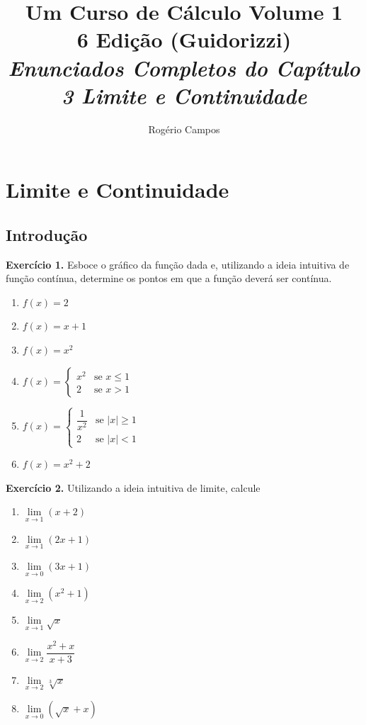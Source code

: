 \documentclass[12pt,a4paper]{article}
\title{
    \Huge \textbf{Um Curso de Cálculo Volume 1} \\
    \vspace{0.3cm}
    \Large 6\textordfeminine{} Edição (Guidorizzi) \\
    \vspace{0.5cm}
    \large \textit{Enunciados Completos do Capítulo 3 Limite e Continuidade}
}
\author{Rogério Campos}
\begin{document}
\maketitle
\newpage

\tableofcontents
\newpage

\setcounter{section}{2}
\setcounter{subsection}{1}

\section{Limite e Continuidade}
\subsection{Introdução}
\vspace{0.5cm}
\noindent\textbf{Exercício 1.} Esboce o gráfico da função dada e, utilizando a ideia intuitiva de função contínua, determine os pontos em que a função deverá ser contínua.
\begin{enumerate}
    \renewcommand{\theenumi}{\alph{enumi}}
    \renewcommand{\labelenumi}{\theenumi)}
    \item $f(x) = 2$
    \item $f(x) = x + 1$
    \item $f(x) = x^2$
    \item $f(x) = \begin{cases} x^2 & \text{se } x \le 1 \\ 2 & \text{se } x > 1 \end{cases}$
    \item $f(x) = \begin{cases} \dfrac{1}{x^2} & \text{se } |x| \ge 1 \\ 2 & \text{se } |x| < 1 \end{cases}$
    \item $f(x) = x^2 + 2$
\end{enumerate}

\vspace{0.5cm}
\noindent\textbf{Exercício 2.} Utilizando a ideia intuitiva de limite, calcule
\begin{enumerate}
    \renewcommand{\theenumi}{\alph{enumi}}
    \renewcommand{\labelenumi}{\theenumi)}
    \item $\lim\limits_{x \to 1} (x + 2)$
    \item $\lim\limits_{x \to 1} (2x + 1)$
    \item $\lim\limits_{x \to 0} (3x + 1)$
    \item $\lim\limits_{x \to 2} (x^2 + 1)$
    \item $\lim\limits_{x \to 1} \sqrt{x}$
    \item $\lim\limits_{x \to 2} \dfrac{x^2 + x}{x + 3}$
    \item $\lim\limits_{x \to 2} \sqrt[3]{x}$
    \item $\lim\limits_{x \to 0} (\sqrt{x} + x)$
\end{enumerate}
\end{document}
